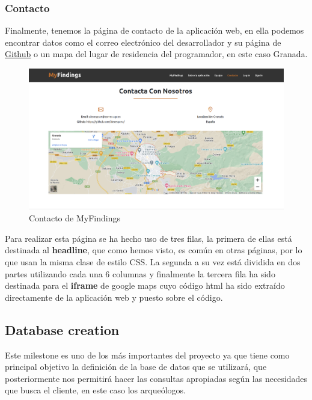     \subsubsection{Contacto}
    Finalmente, tenemos la página de contacto de la aplicación web, en ella podemos
    encontrar datos como el correo electrónico del desarrollador y su página de
    \href{https://github.com/alexespana/}{Github} o un mapa del lugar de residencia del
    programador, en este caso Granada.\\

        \begin{figure}[H]
            \centering
            \includegraphics[scale=0.23]{imagenes/contact.png}
            \caption{Contacto de MyFindings}
            \label{fig:contact}
        \end{figure}

    Para realizar esta página se ha hecho uso de tres filas, la primera de ellas
    está destinada al \textbf{headline}, que como hemos visto, es común en otras páginas, 
    por lo que usan la misma clase de estilo CSS. La segunda a su vez está dividida en 
    dos partes utilizando cada una 6 columnas y finalmente la tercera fila ha sido
    destinada para el \textbf{iframe} de google maps cuyo código html ha sido extraído
    directamente de la aplicación web y puesto sobre el código.

\subsection{Database creation}
Este milestone es uno de los más importantes del proyecto ya que tiene como principal objetivo
la definición de la base de datos que se utilizará, que posteriormente nos permitirá hacer las
consultas apropiadas según las necesidades que busca el cliente, en este caso los arqueólogos.\\

